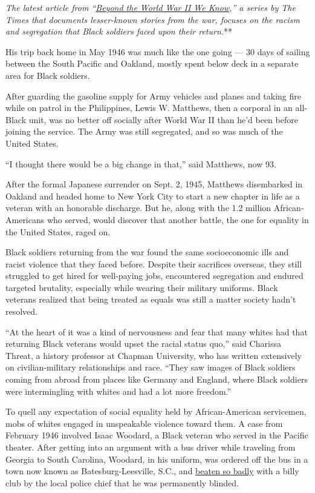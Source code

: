 \emph{\emph{\emph{The latest article from
``}\href{https://www.nytimes.com/spotlight/beyond-wwii}{\emph{Beyond the
World War II We Know}}},'' a series by The Times that documents
lesser-known stories from the war, focuses on the racism and segregation
that Black soldiers faced upon their return.}**

His trip back home in May 1946 was much like the one going --- 30 days
of sailing between the South Pacific and Oakland, mostly spent below
deck in a separate area for Black soldiers.

After guarding the gasoline supply for Army vehicles and planes and
taking fire while on patrol in the Philippines, Lewis W. Matthews, then
a corporal in an all-Black unit, was no better off socially after World
War II than he'd been before joining the service. The Army was still
segregated, and so was much of the United States.

``I thought there would be a big change in that,'' said Matthews, now
93.

After the formal Japanese surrender on Sept. 2, 1945, Matthews
disembarked in Oakland and headed home to New York City to start a new
chapter in life as a veteran with an honorable discharge. But he, along
with the 1.2 million African-Americans who served, would discover that
another battle, the one for equality in the United States, raged on.

Black soldiers returning from the war found the same socioeconomic ills
and racist violence that they faced before. Despite their sacrifices
overseas, they still struggled to get hired for well-paying jobs,
encountered segregation and endured targeted brutality, especially while
wearing their military uniforms. Black veterans realized that being
treated as equals was still a matter society hadn't resolved.

``At the heart of it was a kind of nervousness and fear that many whites
had that returning Black veterans would upset the racial status quo,''
said Charissa Threat, a history professor at Chapman University, who has
written extensively on civilian-military relationships and race. ``They
saw images of Black soldiers coming from abroad from places like Germany
and England, where Black soldiers were intermingling with whites and had
a lot more freedom.''

To quell any expectation of social equality held by African-American
servicemen, mobs of whites engaged in unspeakable violence toward them.
A case from February 1946 involved Isaac Woodard, a Black veteran who
served in the Pacific theater. After getting into an argument with a bus
driver while traveling from Georgia to South Carolina, Woodard, in his
uniform, was ordered off the bus in a town now known as
Batesburg-Leesville, S.C., and
\href{https://www.nytimes.com/2019/02/08/us/sergeant-woodard-batesburg-south-carolina.html}{beaten
so badly} with a billy club by the local police chief that he was
permanently blinded.

